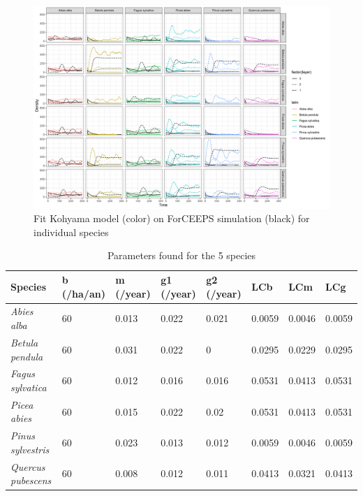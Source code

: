 \documentclass{article}
\begin{document}
\begin{figure}
    \includegraphics[width=\textwidth]{Figure/Simulation_fit.png}
    \caption{Fit Kohyama model (color) on ForCEEPS simulation (black) for individual species}
    \label{fig:Simulation_fit}
\end{figure}

\begin{table}[H]
\begin{center}
    \begin{tabular}{llllllll}
    \hline
    Species & b (/ha/an) & m (/year) & g1 (/year) & g2 (/year) & LCb & LCm & LCg \\ \hline
    \textit{Abies alba}       & 60 & 0.013 & 0.022 & 0.021 & 0.0059 & 0.0046 & 0.0059 \\
    \textit{Betula pendula}   & 60 & 0.031 & 0.022 & 0     & 0.0295 & 0.0229 & 0.0295 \\
    \textit{Fagus sylvatica}  & 60 & 0.012 & 0.016 & 0.016 & 0.0531 & 0.0413 & 0.0531 \\
    \textit{Picea abies}      & 60 & 0.015 & 0.022 & 0.02  & 0.0531 & 0.0413 & 0.0531 \\
    \textit{Pinus sylvestris} & 60 & 0.023 & 0.013 & 0.012 & 0.0059 & 0.0046 & 0.0059 \\
    \textit{Quercus pubescens}& 60 & 0.008 & 0.012 & 0.011 & 0.0413 & 0.0321 & 0.0413 \\ \hline
    \end{tabular}
    \caption{Parameters found for the 5 species}
    \label{tab:Final_param}
\end{center}
\end{table}
\end{document}
